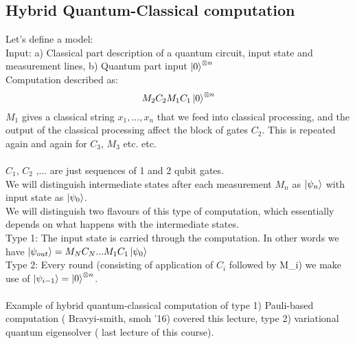\documentclass{article}
\begin{document}
\subsection{Hybrid Quantum-Classical computation}
Let's define a model:\\
Input: a) Classical part description of a quantum circuit, input state and measurement lines, b)  Quantum part input $\ket{0}^{\otimes n}$\\
Computation described as:
$$
 M_2C_2M_1C_1\ket{0}^{\otimes n}
$$
$M_1$ gives a classical string $x_1, ..., x_n$ that we feed into classical processing, and the output of the classical processing affect the block of gates $C_2$. This is repeated again and again for $C_3$, $M_3$ etc. etc.\\\\
$C_1$, $C_2$ ,... are just sequences of 1 and 2 qubit gates.\\
We will distinguish intermediate states after each measurement $M_n$ as $\ket{\psi_n}$ with input state as $\ket{\psi_0}$.\\
We will distinguish two flavours of this type of computation, which essentially depends on what happens with the intermediate states.\\
Type 1: The input state is carried through the computation. In other words we have $\ket{\psi_{out}} = M_N C_N ... M_1 C_1 \ket{\psi_0}$\\
Type 2: Every round (consisting of application of $C_i$ followed by M_i) we make use of $\ket{\psi_{i-1}} = \ket{0}^{\otimes n}$.\\\\
Example of hybrid quantum-classical computation of type 1) Pauli-based computation ( Bravyi-smith, smoh '16) covered this lecture, type 2) variational quantum eigensolver ( last lecture of this course).
\end{document}
